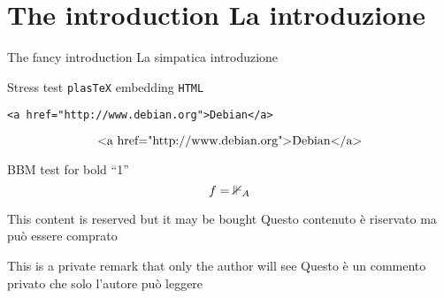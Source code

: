 \section*{\ifCDLeng The introduction \fi  \ifCDLita La introduzione\fi}
\ifCDLeng The fancy introduction \fi  \ifCDLita La simpatica introduzione\fi

\begin{abstract}
  \CDLeng  This simple \LaTeX\ tests some features  of \texttt{plasTeX} and \texttt{ColDoc}.
  \CDLita Questo semplice file  \LaTeX\ mostra le funzionalità di  \texttt{plasTeX} e \texttt{ColDoc}.

  \ifetex Using  \TeX \fi ;
  \ifxetex Using \texttt{XeTeX} \fi ;
  \ifluatex Using \texttt{LuaTeX} \fi ;
  \iftutex Using \texttt{XeTeX} or \texttt{LuaTeX} \fi ;
  \ifplastex Using \texttt{plasTeX} \fi .

\end{abstract}

Stress test  \texttt{plasTeX} embedding \texttt{HTML}
\begin{verbatim}
<a href="http://www.debian.org">Debian</a>
\end{verbatim}
\[ \hbox{<a href="http://www.debian.org">Debian</a>} \]

BBM test for bold ``1''
\[f={\mathbbm{1}}_A\]

\begin{buyablecontent}
  \CDLeng  This content is reserved but it may be bought
  \CDLita  Questo contenuto è riservato ma può essere comprato
\end{buyablecontent}

\begin{privateremark}
  \CDLeng This is a private remark that only the author will see
  \CDLita Questo è un commento privato che solo l'autore può leggere
\end{privateremark}

